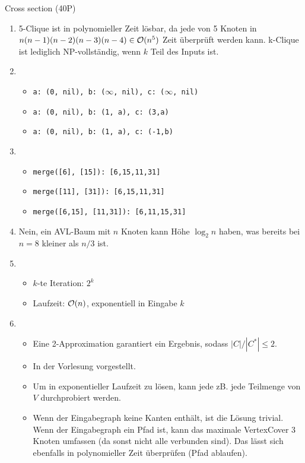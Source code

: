 \documentclass{article}
\begin{document}
\begin{exercise}{Cross section (40P)}
\begin{solution}
\begin{enumerate}
      \item 5-Clique ist in polynomieller Zeit lösbar, da jede von 5 Knoten in $n(n-1)(n-2)(n-3)(n-4)\in \mathcal{O}(n^5)$ Zeit überprüft werden kann. k-Clique ist lediglich NP-vollständig, wenn $k$ Teil des Inputs ist.
      \item \begin{itemize}
              \item \texttt{a: (0, nil), b: ($\infty$, nil), c: ($\infty$, nil)}\par
              \item \texttt{a: (0, nil), b: (1, a), c: (3,a)}\par
              \item \texttt{a: (0, nil), b: (1, a), c: (-1,b)}
            \end{itemize}
      \item \begin{itemize}
              \item \texttt{merge([6], [15]): [6,15,11,31]}
              \item \texttt{merge([11], [31]): [6,15,11,31]}
              \item \texttt{merge([6,15], [11,31]): [6,11,15,31]}
            \end{itemize}
      \item Nein, ein AVL-Baum mit $n$ Knoten kann Höhe $\log_2 n$ haben, was bereits bei $n = 8$ kleiner als $n/3$ ist.
      \item \begin{itemize}
              \item $k$-te Iteration: $2^k$
              \item Laufzeit: $\mathcal{O}(n)$, exponentiell in Eingabe $k$
            \end{itemize}
      \item \begin{itemize}
              \item[\xmark] Eine 2-Approximation garantiert ein Ergebnis, sodass $|C|/|C^*| \leq 2$.
              \item[\checkmark] In der Vorlesung vorgestellt.
              \item[\checkmark] Um  in exponentieller Laufzeit zu lösen, kann jede zB. jede Teilmenge von $V$ durchprobiert werden.
              \item[\checkmark] Wenn der Eingabegraph keine Kanten enthält, ist die Lösung trivial. Wenn der Eingabegraph ein Pfad ist, kann das maximale VertexCover 3 Knoten umfassen (da sonst nicht alle verbunden sind). Das lässt sich ebenfalls in polynomieller Zeit überprüfen (Pfad ablaufen).

\end{itemize}
\end{enumerate}
\end{solution}
\end{exercise}
\end{document}
